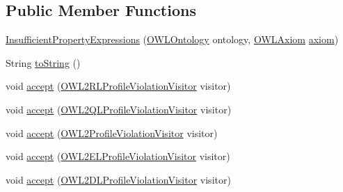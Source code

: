 \subsection*{Public Member Functions}
\begin{DoxyCompactItemize}
\item 
\hyperlink{classorg_1_1semanticweb_1_1owlapi_1_1profiles_1_1_insufficient_property_expressions_a9f43fe5091d4be9894e762b18ae125e8}{Insufficient\-Property\-Expressions} (\hyperlink{interfaceorg_1_1semanticweb_1_1owlapi_1_1model_1_1_o_w_l_ontology}{O\-W\-L\-Ontology} ontology, \hyperlink{interfaceorg_1_1semanticweb_1_1owlapi_1_1model_1_1_o_w_l_axiom}{O\-W\-L\-Axiom} \hyperlink{classorg_1_1semanticweb_1_1owlapi_1_1profiles_1_1_o_w_l_profile_violation_aa7c8e8910ed3966f64a2c003fb516214}{axiom})
\item 
String \hyperlink{classorg_1_1semanticweb_1_1owlapi_1_1profiles_1_1_insufficient_property_expressions_a5ad1b464cd9c8a2e9e916e03a45f770e}{to\-String} ()
\item 
void \hyperlink{classorg_1_1semanticweb_1_1owlapi_1_1profiles_1_1_insufficient_property_expressions_ae4b980fa27b02ccf70b3c8e7e65f6241}{accept} (\hyperlink{interfaceorg_1_1semanticweb_1_1owlapi_1_1profiles_1_1_o_w_l2_r_l_profile_violation_visitor}{O\-W\-L2\-R\-L\-Profile\-Violation\-Visitor} visitor)
\item 
void \hyperlink{classorg_1_1semanticweb_1_1owlapi_1_1profiles_1_1_insufficient_property_expressions_a9a836675ca7fdc83eb1ed7379684a001}{accept} (\hyperlink{interfaceorg_1_1semanticweb_1_1owlapi_1_1profiles_1_1_o_w_l2_q_l_profile_violation_visitor}{O\-W\-L2\-Q\-L\-Profile\-Violation\-Visitor} visitor)
\item 
void \hyperlink{classorg_1_1semanticweb_1_1owlapi_1_1profiles_1_1_insufficient_property_expressions_a84b451fef2397f211e2b8fb95695edcb}{accept} (\hyperlink{interfaceorg_1_1semanticweb_1_1owlapi_1_1profiles_1_1_o_w_l2_profile_violation_visitor}{O\-W\-L2\-Profile\-Violation\-Visitor} visitor)
\item 
void \hyperlink{classorg_1_1semanticweb_1_1owlapi_1_1profiles_1_1_insufficient_property_expressions_a46f4d0da88775a056908eb490054fc55}{accept} (\hyperlink{interfaceorg_1_1semanticweb_1_1owlapi_1_1profiles_1_1_o_w_l2_e_l_profile_violation_visitor}{O\-W\-L2\-E\-L\-Profile\-Violation\-Visitor} visitor)
\item 
void \hyperlink{classorg_1_1semanticweb_1_1owlapi_1_1profiles_1_1_insufficient_property_expressions_a19e172fc34dc452b905a902f0917b069}{accept} (\hyperlink{interfaceorg_1_1semanticweb_1_1owlapi_1_1profiles_1_1_o_w_l2_d_l_profile_violation_visitor}{O\-W\-L2\-D\-L\-Profile\-Violation\-Visitor} visitor)
\end{DoxyCompactItemize}


